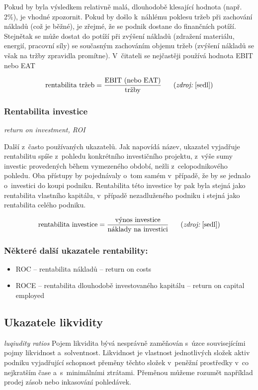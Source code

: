 Pokud by byla výsledkem relativně malá, dlouhodobě klesající hodnota (např. 2\%), je vhodné zpozornit. Pokud by došlo k~náhlému poklesu tržeb při zachování nákladů (což je běžné), je zřejmé, že se podnik dostane do finančních potíží. Stejnětak se může dostat do potíží při zvýšení nákladů (zdražení materiálu, energií, pracovní síly) se současným zachováním objemu tržeb (zvýšení nákladů se však na tržby zpravidla promítne). 
V~čitateli se nejčastěji používá hodnota EBIT nebo EAT

$$\vz{rentabilita tržeb}{EBIT (nebo EAT)}{tržby} \scite{sedl}$$ 

\pagebreak
\subsubsection{Rentabilita investice}
\textit{return on investment, ROI}

Další z~často používaných ukazatelů. Jak napovídá název, ukazatel vyjadřuje rentabilitu spíše z~pohledu konkrétního investičního projektu, z~výše sumy investic provedených během vymezeného období, nežli z~celopodnikového pohledu. Oba přístupy by pojednávaly o~tom samém v~případě, že by se jednalo o~investici do koupi podniku. Rentabilita této investice by pak byla stejná jako rentabilita vlastního kapitálu, v~případě nezadluženého podniku i stejná jako rentabilita celého podniku.

$$\vz{rentabilita investice}{výnos investice}{náklady na investici} \scite{sedl} $$ 

\subsubsection{Některé další ukazatele rentability:}
\begin{itemize}
\item{ROC -- rentabilita nákladů} -- return on costs
\item{ROCE -- rentabilita dlouhodobě investovaného kapitálu} -- return on capital employed
\end{itemize}







\subsection{Ukazatele likvidity}
\textit{luqiudity ratios}
Pojem likvidita bývá nesprávně zaměňován s~úzce souvisejícími pojmy likvidnost a~solventnost. Likvidnost je vlastnost jednotlivých složek aktiv podniku vyjadřující schopnost přeměny těchto složek v~peněžní prostředky v~co nejkratším čase a~s~minimálními ztrátami.\cite{nyvlt} Přeměnou můžeme rozumět například prodej zásob nebo inkasování pohledávek. 

